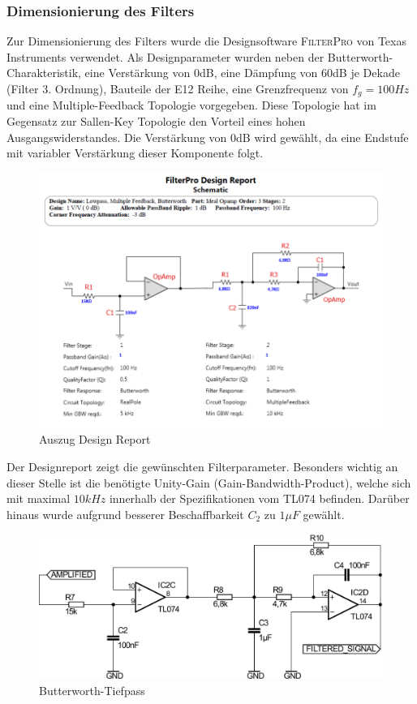 \subsubsection{Dimensionierung des Filters}
Zur Dimensionierung des Filters wurde die Designsoftware \textsc{FilterPro} von Texas Instruments verwendet. Als Designparameter wurden neben der Butter\-worth-Charakteristik, eine Verstärkung von 0dB, eine Dämpfung von 60dB je Dekade (Filter 3. Ordnung), Bauteile der E12 Reihe, eine Grenzfrequenz von $f_g=100Hz$ und eine Multiple-Feedback Topologie vorgegeben. Diese Topologie hat im Gegensatz zur Sallen-Key Topologie den Vorteil eines hohen Ausgangswiderstandes. Die Verstärkung von 0dB wird gewählt, da eine Endstufe mit variabler Verstärkung dieser Komponente folgt.
\begin{figure}[H]
	\centering
	\includegraphics[scale=0.575]{gfx/Butterworth_FilterPro.png}
	\caption{Auszug Design Report}
	\label{fig:design_report}
\end{figure}
\noindent
Der Designreport zeigt die gewünschten Filterparameter. Besonders wichtig an dieser Stelle ist die benötigte Unity-Gain (Gain-Bandwidth-Product), welche sich mit maximal $10kHz$ innerhalb der Spezifikationen vom \textsc{TL074} befinden. Darüber hinaus wurde aufgrund besserer Beschaffbarkeit $C_2$ zu $1\mu F$ gewählt.
\begin{figure}[H]
	\centering
	\includegraphics[scale=0.5]{gfx/filter.pdf}
	\caption{Butterworth-Tiefpass}
\end{figure}

